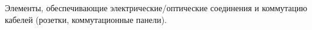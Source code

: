 Элементы, обеспечивающие электрические/оптические
соединения и коммутацию кабелей (розетки, коммутационные панели).